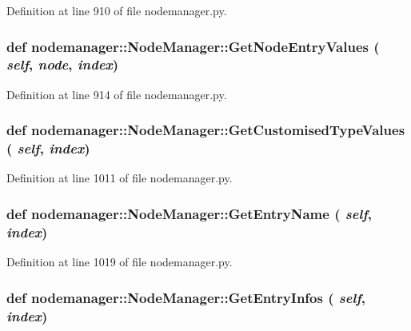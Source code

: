 Definition at line 910 of file nodemanager.py.\hypertarget{classnodemanager_1_1NodeManager_70a4ab2beffa0508c94e2e5c29807d18}{
\subsubsection[GetNodeEntryValues]{\setlength{\rightskip}{0pt plus 5cm}def nodemanager::Node\-Manager::Get\-Node\-Entry\-Values ( {\em self},  {\em node},  {\em index})}}
\label{classnodemanager_1_1NodeManager_70a4ab2beffa0508c94e2e5c29807d18}




Definition at line 914 of file nodemanager.py.\hypertarget{classnodemanager_1_1NodeManager_587b1972ff83655696f30d4bb87894a4}{
\subsubsection[GetCustomisedTypeValues]{\setlength{\rightskip}{0pt plus 5cm}def nodemanager::Node\-Manager::Get\-Customised\-Type\-Values ( {\em self},  {\em index})}}
\label{classnodemanager_1_1NodeManager_587b1972ff83655696f30d4bb87894a4}




Definition at line 1011 of file nodemanager.py.\hypertarget{classnodemanager_1_1NodeManager_4da3a475cb7e66bf86f42aa8e9915673}{
\subsubsection[GetEntryName]{\setlength{\rightskip}{0pt plus 5cm}def nodemanager::Node\-Manager::Get\-Entry\-Name ( {\em self},  {\em index})}}
\label{classnodemanager_1_1NodeManager_4da3a475cb7e66bf86f42aa8e9915673}




Definition at line 1019 of file nodemanager.py.\hypertarget{classnodemanager_1_1NodeManager_eb864b0df23c119a93ec91836f7dc131}{
\subsubsection[GetEntryInfos]{\setlength{\rightskip}{0pt plus 5cm}def nodemanager::Node\-Manager::Get\-Entry\-Infos ( {\em self},  {\em index})}}
\label{classnodemanager_1_1NodeManager_eb864b0df23c119a93ec91836f7dc131}





